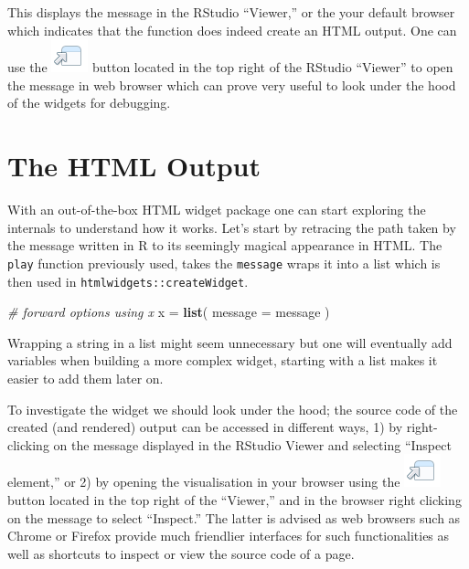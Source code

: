 \documentclass[
]{krantz}
\makeatletter
\newenvironment{Shaded}{\begin{snugshade}}{\end{snugshade}}
\newcommand{\CommentTok}[1]{\textcolor[rgb]{0.37,0.37,0.37}{\textit{#1}}}
\newcommand{\DataTypeTok}[1]{\textcolor[rgb]{0.27,0.27,0.27}{#1}}
\newcommand{\KeywordTok}[1]{\textcolor[rgb]{0.27,0.27,0.27}{\textbf{#1}}}
\newcommand{\NormalTok}[1]{#1}
\newcommand{\StringTok}[1]{\textcolor[rgb]{0.5,0.5,0.5}{#1}}
\newenvironment{kframe}{%
\medskip{}
\setlength{\fboxsep}{.8em}
 \def\at@end@of@kframe{}%
 \ifinner\ifhmode%
  \def\at@end@of@kframe{\end{minipage}}%
  \begin{minipage}{\columnwidth}%
 \fi\fi%
 \def\FrameCommand##1{\hskip\@totalleftmargin \hskip-\fboxsep
 \colorbox{shadecolor}{##1}\hskip-\fboxsep
     \hskip-\linewidth \hskip-\@totalleftmargin \hskip\columnwidth}%
 \MakeFramed {\advance\hsize-\width
   \@totalleftmargin\z@ \linewidth\hsize
   \@setminipage}}%
 {\par\unskip\endMakeFramed%
 \at@end@of@kframe}
\renewenvironment{Shaded}{\begin{kframe}}{\end{kframe}}
\makeatother
\begin{document}
This displays the message in the RStudio ``Viewer,'' or the your default browser which indicates that the function does indeed create an HTML output. One can use the \includegraphics{images/open-in-browser.png} button located in the top right of the RStudio ``Viewer'' to open the message in web browser which can prove very useful to look under the hood of the widgets for debugging.

\hypertarget{widgets-first-htmloutput}{%
\section{The HTML Output}\label{widgets-first-htmloutput}}

With an out-of-the-box HTML widget package one can start exploring the internals to understand how it works. Let's start by retracing the path taken by the message written in R to its seemingly magical appearance in HTML. The \texttt{play} function previously used, takes the \texttt{message} wraps it into a list which is then used in \texttt{htmlwidgets::createWidget}.

\begin{Shaded}
\begin{Highlighting}[]
\CommentTok{\# forward options using x}
\NormalTok{x =}\StringTok{ }\KeywordTok{list}\NormalTok{(}
  \DataTypeTok{message =}\NormalTok{ message}
\NormalTok{)}
\end{Highlighting}
\end{Shaded}

Wrapping a string in a list might seem unnecessary but one will eventually add variables when building a more complex widget, starting with a list makes it easier to add them later on.

To investigate the widget we should look under the hood; the source code of the created (and rendered) output can be accessed in different ways, 1) by right-clicking on the message displayed in the RStudio Viewer and selecting ``Inspect element,'' or 2) by opening the visualisation in your browser using the \includegraphics{images/open-in-browser.png} button located in the top right of the ``Viewer,'' and in the browser right clicking on the message to select ``Inspect.'' The latter is advised as web browsers such as Chrome or Firefox provide much friendlier interfaces for such functionalities as well as shortcuts to inspect or view the source code of a page.
\end{document}
